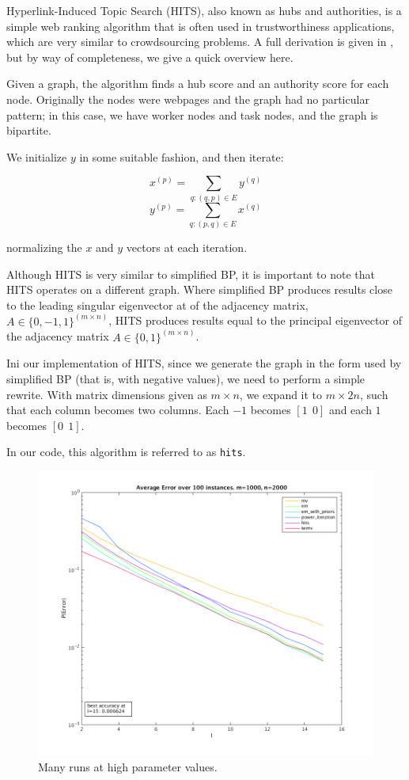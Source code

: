 \documentclass[11pt]{article}
\begin{document}
Hyperlink-Induced Topic Search (HITS), also known as hubs and authorities, is a simple web ranking algorithm that is often used in trustworthiness applications, which are very similar to crowdsourcing problems. A full derivation is given in \cite{kleinberg1999authoritative}, but by way of completeness, we give a quick overview here. 

Given a graph, the algorithm finds a hub score and an authority score for each node. Originally the nodes were webpages and the graph had no particular pattern; in this case, we have worker nodes and task nodes, and the graph is bipartite. 

We initialize $y$ in some suitable fashion, and then iterate:

\[ x^{(p)} = \sum_{q:(q,p)\in E} y^{(q)} \]
\[ y^{(p)} = \sum_{q:(p,q)\in E} x^{(q)} \]

normalizing the $x$ and $y$ vectors at each iteration. 

Although HITS is very similar to simplified BP, it is important to note that HITS operates on a different graph. Where simplified BP produces results close to the leading singular eigenvector at of the adjacency matrix, $A \in \{0, -1, 1\}^{(m\times n)}$, HITS produces results equal to the principal eigenvector of the adjacency matrix $A \in \{0, 1\}^{(m\times n)}$.

Ini our implementation of HITS, since we generate the graph in the form used by simplified BP (that is, with negative values), we need to perform a simple rewrite. With matrix dimensions given as $m \times n$, we expand it to $m \times 2n$, such that each column becomes two columns. Each $-1$ becomes $[1~~ 0]$ and each $1$ becomes $[0~~ 1]$. 

In our code, this algorithm is referred to as \texttt{hits}. 

\begin{figure}[t]
\centering
\includegraphics[scale=0.7]{all.png}
\caption{Many runs at high parameter values.}
\label{fig:all}
\end{figure}
\end{document}
